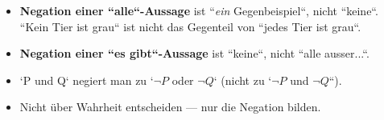 \begin{achtung}
\begin{itemize}
  \item \textbf{Negation einer ``alle``-Aussage} ist ``\emph{ein}
        Gegenbeispiel``, nicht ``keine``. ``Kein Tier ist grau`` ist nicht
        das Gegenteil von ``jedes Tier ist grau``.
  \item \textbf{Negation einer ``es gibt``-Aussage} ist ``keine``, nicht
        ``alle ausser...``.
  \item `P und Q` negiert man zu `$\neg P$ oder $\neg Q$` (nicht zu
        `$\neg P$ und $\neg Q$``).
  \item Nicht über Wahrheit entscheiden --- nur die Negation bilden.
\end{itemize}
\end{achtung}
